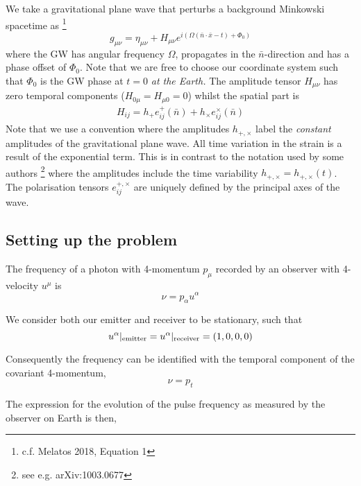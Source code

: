 \documentclass{tufte-handout} %
\begin{document}
\noindent We take a gravitational plane wave that perturbs a background Minkowski spacetime as \footnote{c.f. Melatos 2018, Equation 1}
\begin{equation}
g_{\mu \nu} = \eta_{\mu \nu} + H_{\mu \nu} e^{i(\Omega(\bar{n} \cdot \bar{x} - t) + \Phi_0)	}
\end{equation}
where the GW has angular frequency $\Omega$, propagates in the $\bar{n}$-direction and has a phase offset of  $\Phi_0$. Note that we are free to choose our coordinate system such that $\Phi_0$ is the GW phase at $t=0$ \textit{at the Earth.} The amplitude tensor $H_{\mu \nu}$ has zero temporal components ($H_{0 \mu} = H_{\mu 0} = 0$) whilst the spatial part is
\begin{align}
	H_{ij} = h_+ e_{ij}^+(\bar{n}) + h_{\times} e_{ij}^{\times}(\bar{n})
\end{align}
\noindent Note that we use a convention where the amplitudes $h_{+,\times}$ label the \textit{constant} amplitudes of the gravitational plane wave. All time variation in the strain is a result of the exponential term. This is in contrast to the notation used by some authors \footnote{see e.g. arXiv:1003.0677} where the amplitudes include the time variability $h_{+,\times} = h_{+,\times}(t)$. The polarisation tensors $e_{ij}^{+,\times}$ are uniquely defined by the principal axes of the wave. \newline 


\subsection{Setting up the problem}
The frequency of a photon with 4-momentum $p_{\mu}$ recorded by an observer with 4-velocity $u^{\mu}$ is 
\begin{equation}
	\nu = p_{\alpha} u^{\alpha}
\end{equation}


\noindent We consider both our emitter and receiver to be stationary, such that  
\begin{equation}
u^{\alpha}|_{\rm emitter} = u^{\alpha}|_{\rm receiver} = (1,0,0,0)
\end{equation}



\noindent Consequently the frequency can be identified with the temporal component of the covariant 4-momentum,
\begin{equation}
\nu = p_t
\end{equation}


\noindent The expression for the evolution of the pulse frequency as measured by the observer on Earth is then,
\end{document}
